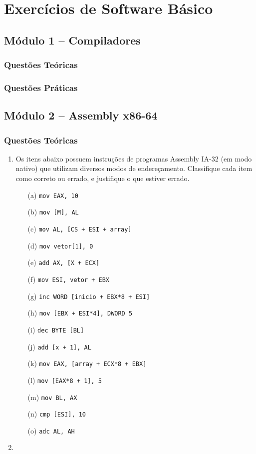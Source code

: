 \documentclass[11pt, a4paper]{book}
\newcommand{\asm}[1]{{\tt#1}}
\begin{document}
\chapter{Exercícios de Software Básico}

\section{Módulo 1 -- Compiladores}
\subsection{Questões Teóricas}			
\subsection{Questões Práticas}

\section{Módulo 2 -- Assembly x86-64}
\subsection{Questões Teóricas}

\begin{enumerate}
    \item
    Os itens abaixo possuem instruções de programas Assembly IA-32 (em modo nativo) 
    que utilizam diversos modos de endereçamento. 
    Classifique cada item como correto ou errado, e justifique o que estiver errado.
    \begin{itemize}
        \item[(a)] \asm{mov EAX, 10}
        \item[(b)] \asm{mov [M], AL}
        \item[(c)] \asm{mov AL, [CS + ESI + array]}
        \item[(d)] \asm{mov vetor[1], 0}
        \item[(e)] \asm{add AX, [X + ECX]}
        \item[(f)] \asm{mov ESI, vetor + EBX}
        \item[(g)] \asm{inc WORD [inicio + EBX*8 + ESI]}
        \item[(h)] \asm{mov [EBX + ESI*4], DWORD 5}
        \item[(i)] \asm{dec BYTE [BL]}
        \item[(j)] \asm{add [x + 1], AL} 
        \item[(k)] \asm{mov EAX, [array + ECX*8 + EBX]}
        \item[(l)] \asm{mov [EAX*8 + 1], 5}
        \item[(m)] \asm{mov BL, AX}
        \item[(n)] \asm{cmp [ESI], 10}
        \item[(o)] \asm{adc AL, AH}
    \end{itemize}

    \item
\end{enumerate}
			
\end{document}
